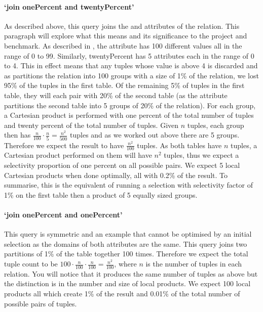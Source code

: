 \paragraph{`join onePercent and twentyPercent'} As described above, this query
joins the  and 
attributes of the  relation. This paragraph will explore
what this means and its significance to the project and benchmark. As described
in , the attribute 
has 100 different values all in the range of 0 to 99. Similarly, twentyPercent
has 5 attributes each in the range of 0 to 4. This in effect means that any
tuples whose  value is above 4 is discarded and as
 partitions the relation into 100 groups with a
size of 1\% of the relation, we lost 95\% of the tuples in the first table. Of
the remaining 5\% of tuples in the first table, they will each pair with 20\% of
the second table (as the attribute  partitions
the second table into 5 groups of 20\% of the relation). For each group, a
Cartesian product is performed with one percent of the total number of tuples
and twenty percent of the total number of tuples. Given $n$ tuples, each group
then has $\frac{n}{100} \cdot \frac{n}{5} = \frac{n^2}{500}$ tuples and as we
worked out above there are 5 groups. Therefore we expect the result to have
$\frac{n^2}{100}$ tuples. As both tables have $n$ tuples, a Cartesian product
performed on them will have $n^2$ tuples, thus we expect a selectivity
proportion of one percent on all possible pairs. We expect 5 local Cartesian
products when done optimally, all with 0.2\% of the result. To summarise, this
is the equivalent of running a selection with selectivity factor of 1\% on the
first table then a product of 5 equally sized groups.

\paragraph{`join onePercent and onePercent'} This query is symmetric and an
example that cannot be optimised by an initial selection as the domains of both
attributes are the same. This query joins two partitions of 1\% of the table
together 100 times. Therefore we expect the total tuple count to be $100 \cdot
\frac{n}{100} \cdot \frac{n}{100} = \frac{n^2}{100}$, where $n$ is the number of
tuples in each relation. You will notice that it produces the same number of
tuples as above but the distinction is in the number and size of local products.
We expect 100 local products all which create 1\% of the result and 0.01\% of
the total number of possible pairs of tuples.

